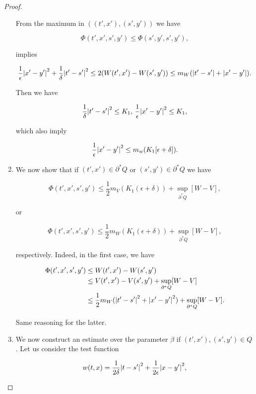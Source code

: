 \begin{proof}
\begin{enumerate}
        From the maximum in $((t',x'),(s',y'))$ we have

        \[\Phi(t',x',s',y') \leq \Phi(s',y',s',y'),\]

        implies

        \[\frac{1}{\epsilon}\abs{x'-y'}^2 + \frac{1}{\delta}\abs{t'-s'}^2\leq 2(W(t',x')-W(s',y')) \leq m_W(\abs{t'-s'}+\abs{x'-y'}).\]

        Then we have

        \[\frac{1}{\delta}\abs{t'-s'}^2\leq K_1,\,\frac{1}{\epsilon}\abs{x'-y'}^2\leq K_1,\]

        which also imply

        \[\frac{1}{\epsilon}\abs{x'-y'}^2\leq m_w(K_1[\epsilon+\delta]).\]

        \item We now show that if $(t',x')\in\partial^{\ast}Q$ or $(s',y')\in\partial^{\ast}Q$ we have
        
        \begin{equation}\label{4-2-InProofSup:phiestim1}
            \Phi(t',x',s',y') \leq\frac{1}{2}m_V(K_1(\epsilon+\delta)) + \sup_{\partial^{\ast}Q}[W-V],
        \end{equation}

        or 

        \begin{equation}\label{4-2-InProofSup:phiestim2}
            \Phi(t',x',s',y') \leq\frac{1}{2}m_W(K_1(\epsilon+\delta)) + \sup_{\partial^{\ast}Q}[W-V],
        \end{equation}

        respectively. Indeed, in the first case, we have

        \begin{align*}\Phi(t',x',s',y')&\leq W(t',x') - W(s',y') \\ & \leq  V(t',x') - V(s',y') + \sup_{\partial^{\ast}Q}[W-V] \\
        & \leq \frac{1}{2}m_W(\abs{t'-s'}^2+\abs{x'-y'}^2) +  \sup_{\partial^{\ast}Q}[W-V]. \end{align*}

        Same reasoning for the latter.

        \item We now construct an estimate over the parameter $\beta$ if $(t',x'),(s',y')\in Q$. Let us consider the test function
        
        \[w(t,x) = \frac{1}{2\delta}\abs{t-s'}^2 + \frac{1}{2\epsilon}\abs{x-y'}^2,\]


\end{enumerate}
\end{proof}
